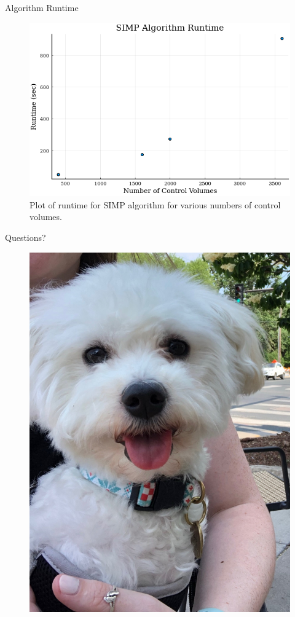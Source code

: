 \documentclass[final]{beamer}
\begin{document}
\begin{frame}{Algorithm Runtime}
	\begin{figure}
		\centering
		\includegraphics[width=0.8\linewidth]{SIMP-Runtime.png}
		\caption[SIMP Runtime Plot]{Plot of runtime for SIMP algorithm for various numbers of control volumes.}
		\label{fig:runtime}
	\end{figure}
\end{frame}


\begin{frame}{Questions?}
	\begin{figure}
		\centering
		\includegraphics[height=0.8\textheight]{elske.jpg}
	\end{figure}
\end{frame}
\end{document}
